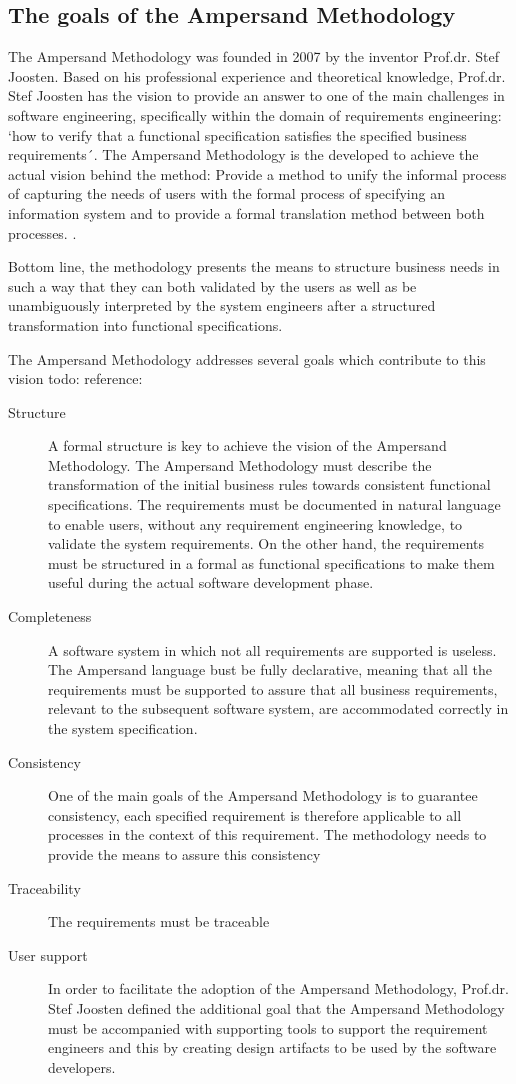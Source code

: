 \subsection{The goals of the Ampersand Methodology}
   
The Ampersand Methodology was founded in 2007 by the inventor Prof.dr. Stef Joosten. 
Based on his professional experience and theoretical knowledge, Prof.dr. Stef Joosten has the vision to provide an answer to one of the main challenges in software engineering, specifically within the domain of requirements engineering: `how to verify that a functional specification satisfies the specified business requirements´. The Ampersand Methodology is the developed to achieve the actual vision behind the method:  Provide a method to unify the informal process of capturing the needs of users with the formal process of specifying an information system and to provide a formal translation method between both processes. \cite{Joosten_derivingfunctional}.

Bottom line, the methodology presents the means to structure business needs in such a way that they can both validated by the users as well as be unambiguously interpreted by the system engineers after a structured transformation into functional specifications.

The Ampersand Methodology addresses several goals which contribute to this vision todo: reference:
\begin{description}
	\item[Structure] A formal structure is key to achieve the vision of the Ampersand Methodology. The Ampersand Methodology must describe the transformation of the initial business rules towards consistent functional specifications. The requirements must be documented in natural language to enable users, without any requirement engineering knowledge, to validate the system requirements. On the other hand, the requirements must be structured in a formal as functional specifications to make them useful during the actual software development phase.
	\item[Completeness]A software system in which not all requirements are supported is useless. The Ampersand language bust be fully declarative, meaning that all the requirements must be supported to assure that all business requirements, relevant to the subsequent software system, are accommodated correctly in the system specification.
	\item[Consistency]One of the main goals of the Ampersand Methodology is to guarantee consistency, each specified requirement is therefore applicable to all processes in the context of this requirement. The methodology needs to provide the means to assure this consistency
	\item[Traceability] The requirements must be traceable 
	\item[User support] In order to facilitate the adoption of the Ampersand Methodology, Prof.dr. Stef Joosten defined the additional goal that the Ampersand Methodology must be accompanied with supporting tools to support the requirement engineers and this by creating design artifacts to be used by the software developers.
\end{description}



